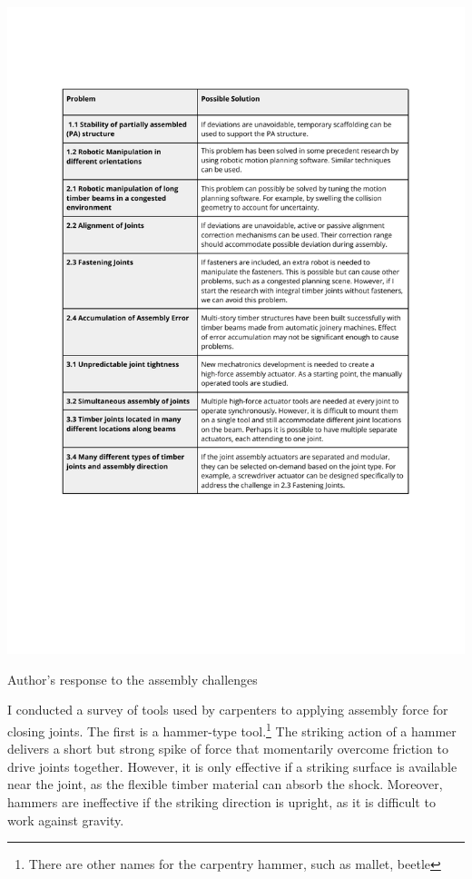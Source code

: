\begin{table}[p]
    \includegraphics[page=1, trim=25.4mm 60mm 25.4mm 33mm, clip, width=\textwidth]{tables/Tables in Chapter 4.pdf}
    \caption{Author's response to the assembly challenges}
    \label{table:response-to-challenges}
\end{table}

I conducted a survey of tools used by carpenters to applying assembly force for closing joints. The first is a hammer-type tool.\footnote{There are other names for the carpentry hammer, such as mallet, beetle} The striking action of a hammer delivers a short but strong spike of force that momentarily overcome friction to drive joints together. However, it is only effective if a striking surface is available near the joint, as the flexible timber material can absorb the shock. Moreover, hammers are ineffective if the striking direction is upright, as it is difficult to work against gravity.

